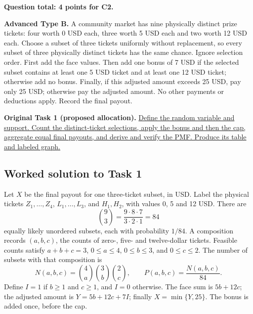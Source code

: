 \textbf{Question total: 4 points for C2.}

\clearpage
{}

\textbf{Advanced Type B.} A community market has nine physically distinct prize tickets: four worth 0 USD each, three worth 5 USD each and two worth 12 USD each. Choose a subset of three tickets uniformly without replacement, so every subset of three physically distinct tickets has the same chance. Ignore selection order. First add the face values. Then add one bonus of 7 USD if the selected subset contains at least one 5 USD ticket and at least one 12 USD ticket; otherwise add no bonus. Finally, if this adjusted amount exceeds 25 USD, pay only 25 USD; otherwise pay the adjusted amount. No other payments or deductions apply. Record the final payout.

\textbf{Original Task 1 (proposed allocation).} \hyperref[sol:q6t1]{Define the random variable and support. Count the distinct-ticket selections, apply the bonus and then the cap, aggregate equal final payouts, and derive and verify the PMF. Produce its table and labeled graph.} 


\subsection*{Worked solution to Task 1 }
\label{sol:q6t1}

Let $X$ be the final payout for one three-ticket subset, in USD. Label the physical tickets $Z_1,\ldots,Z_4$, $L_1,\ldots,L_3$, and $H_1,H_2$, with values 0, 5 and 12 USD. There are
\[
\binom93=\frac{9\cdot8\cdot7}{3\cdot2\cdot1}=84
\]
equally likely unordered subsets, each with probability $1/84$. A composition records $(a,b,c)$, the counts of zero-, five- and twelve-dollar tickets. Feasible counts satisfy $a+b+c=3$, $0\leq a\leq4$, $0\leq b\leq3$, and $0\leq c\leq2$. The number of subsets with that composition is
\[
N(a,b,c)=\binom4a\binom3b\binom2c,\qquad P(a,b,c)=\frac{N(a,b,c)}{84}.
\]
Define $I=1$ if $b\geq1$ and $c\geq1$, and $I=0$ otherwise. The face sum is $5b+12c$; the adjusted amount is $Y=5b+12c+7I$; finally $X=\min\{Y,25\}$. The bonus is added once, before the cap.

\begingroup\renewcommand{\arraystretch}{1.35}

